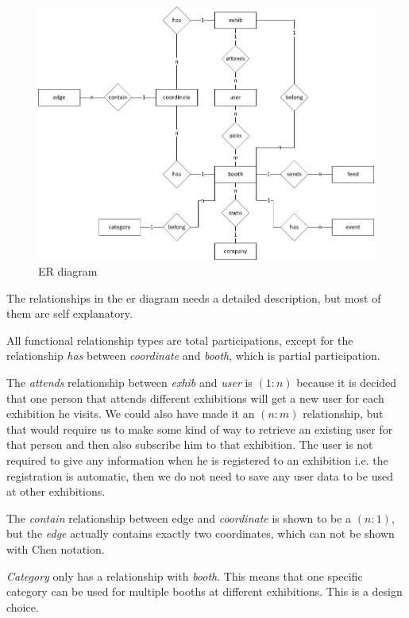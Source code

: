 \begin{figure}[H]
\centering
\includegraphics[page=1,width=1\linewidth]{img/sw7ERD.pdf}
\caption{ER diagram}
\label{fig:erd}
\end{figure}

\newcommand{\rel}[2]{$(#1:#2)$}

The relationships in the \ac{er} diagram needs a detailed description, but most of them are self explanatory.

All functional relationship types are total participations, except for the relationship \textit{has} between \textit{coordinate} and \textit{booth}, which is partial participation.

The \textit{attends} relationship between \textit{exhib} and \textit{user} is \rel{1}{n} because it is decided that one person that attends different exhibitions will get a new user for each exhibition he visits. We could also have made it an \rel{n}{m} relationship, but that would require us to make some kind of way to retrieve an existing user for that person and then also subscribe him to that exhibition. The user is not required to give any information when he is registered to an exhibition i.e. the registration is automatic, then we do not need to save any user data to be used at other exhibitions.

The \textit{contain} relationship between edge and \textit{coordinate} is shown to be a \rel{n}{1}, but the \textit{edge} actually contains exactly two coordinates, which can not be shown with Chen notation.

\textit{Category} only has a relationship with \textit{booth}. This means that one specific category can be used for multiple booths at different exhibitions. This is a design choice.

